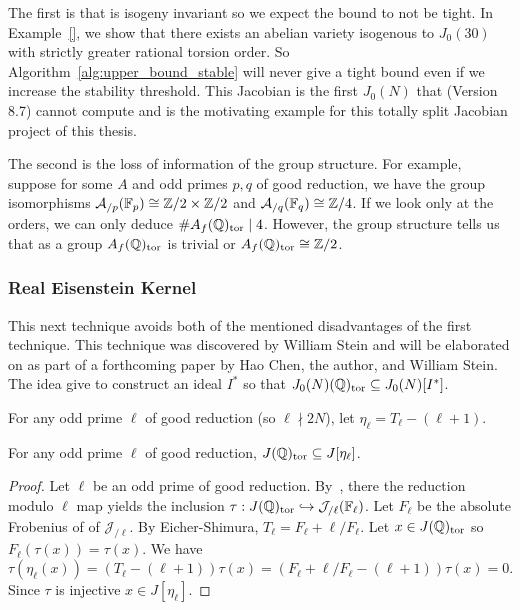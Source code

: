 The first is that is isogeny invariant so we expect the bound to not be tight.
In Example~\ref{}, we show that there exists an abelian variety isogenous to
$J_0(30)$ with strictly greater rational torsion order. So
Algorithm~\ref{alg:upper_bound_stable} will never give a tight bound even if we
increase the stability threshold. This Jacobian is the first $J_0(N)$ that
\sage (Version 8.7) cannot compute and is the motivating example for this
totally split Jacobian project of this thesis.

The second is the loss of information of the group structure. For example,
suppose for some $A$ and odd primes $p,q$ of good reduction, we have the
group isomorphisms $\mathcal{A}_{/p}(\mathbb{F}_p)\cong \mathbb{Z}/2\times \mathbb{Z}/2$ and
$\mathcal{A}_{/q}(\mathbb{F}_q)\cong \mathbb{Z}/4$. If we look only at the orders, we can only
deduce $\# A_f(\mathbb{Q})_{\mathrm{tor}}\mid 4$. However, the group structure tells us that as
a group $A_f(\mathbb{Q})_{\mathrm{tor}}$ is trivial or $A_f(\mathbb{Q})_{\mathrm{tor}} \cong \mathbb{Z}/2$.

\subsubsection{Real Eisenstein Kernel}%
\label{ssub:real_eisenstein_kernel}

This next technique avoids both of the mentioned disadvantages of the first
technique. This technique was discovered by William Stein and will be
elaborated on as part of a forthcoming paper by Hao Chen, the author, and
William Stein. The idea give to construct an ideal $I^*$ so that
$J_0(N)(\mathbb{Q})_{\mathrm{tor}}\subseteq J_0(N)[I^*]$.

For any odd prime $\ell$ of good reduction (so $\ell\nmid 2N$), let
$\eta_\ell = T_\ell - (\ell+1)$.
\begin{lemma}%
    \label{lem:rational_is_eta}
    For any odd prime $\ell$ of good reduction, $J(\mathbb{Q})_{\mathrm{tor}}\subseteq
    J[\eta_\ell]$.
\end{lemma}
\begin{proof}
    Let $\ell$ be an odd prime of good reduction.
    By~\cite[Appendix]{katz:torsion}, there the reduction modulo $\ell$ map
    yields the inclusion $\tau:J(\mathbb{Q})_{\mathrm{tor}} \hookrightarrow
    \mathcal{J}_{/\ell}(\mathbb{F}_\ell)$. Let $F_\ell$ be the absolute Frobenius of of
    $\mathcal{J}_{/\ell}$. By Eicher-Shimura, $T_\ell=F_\ell+\ell/F_\ell$. Let
    $x\in J(\mathbb{Q})_{\mathrm{tor}}$ so $F_\ell(\tau(x))=\tau(x)$. We have
    \[
        \tau(\eta_\ell(x)) = (T_\ell-(\ell+1))\tau(x) =
        (F_\ell+\ell/F_\ell-(\ell+1))\tau(x) = 0.
    \]
    Since $\tau$ is injective $x\in J[\eta_\ell]$.
\end{proof}

